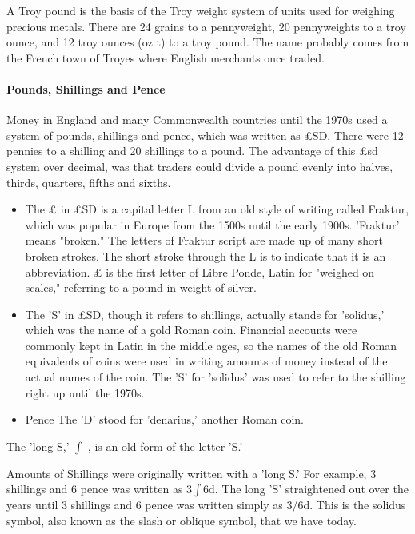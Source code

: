 \documentclass[12pt]{article}
\begin{document}
{A Troy pound is the basis of the Troy weight system of units used for weighing precious metals. There are 24 grains to a pennyweight, 20 pennyweights to a troy ounce, and 12 troy ounces (oz t) to a troy pound. The name probably comes from the French town of Troyes where English merchants once traded.

\paragraph{Pounds, Shillings and Pence}
Money in England and many Commonwealth countries until the 1970s used a system of pounds, shillings and pence, which was written as £SD. There were 12 pennies to a shilling and 20 shillings to a pound. The advantage of this £sd system over decimal, was that traders could divide a pound evenly into halves, thirds, quarters, fifths and sixths.
\begin{itemize}
    \item The £ in £SD is a capital letter L from an old style of writing called Fraktur, which was popular in Europe from the 1500s until the early 1900s. 'Fraktur' means "broken." The letters of Fraktur script are made up of many short broken strokes. The short stroke through the L is to indicate that it is an abbreviation. £ is the first letter of Libre Ponde, Latin for "weighed on scales," referring to a pound in weight of silver.
    \item The 'S' in £SD, though it refers to shillings, actually stands for 'solidus,' which was the name of a gold Roman coin. Financial accounts were commonly kept in Latin in the middle ages, so the names of the old Roman equivalents of coins were used in writing amounts of money instead of the actual names of the coin. The 'S' for 'solidus' was used to refer to the shilling right up until the 1970s.
    \item{Pence} The 'D' stood for 'denarius,' another Roman coin.
\end{itemize}

The 'long S,’ $\int$ , is an old form of the letter ’S.’

Amounts of Shillings were originally written with a 'long S.' For example, 3 shillings and 6 pence was written as 3$\int$6d. The long 'S' straightened out over the years until 3 shillings and 6 pence was written simply as 3/6d. This is the solidus symbol, also known as the slash or oblique symbol, that we have today.

}
\end{document}

